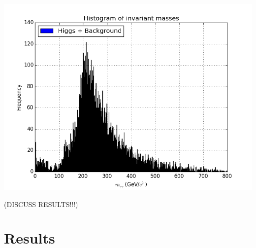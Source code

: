 \documentclass[11pt]{amsart}
\newenvironment{Figure}
  {\par\medskip\noindent\minipage{\linewidth}}
  {\endminipage\par\medskip}
\begin{document}
\begin{multicols}{2}
\begin{Figure}
  \centering
  \includegraphics[width=\linewidth]{invmass}
  \label{fig:invmass}
\end{Figure}

(DISCUSS RESULTS!!!)

\section{Results}

\end{multicols}



\end{document}

